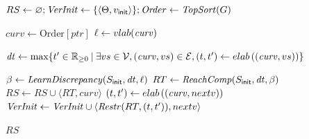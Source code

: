 \begin{algorithm}[h!]
\caption{$\GraphReach(\H)$ computes bounded time reachtubes for each vertex of the transition $G$ of hybrid system $\H$.}
\label{alg:ComputeRT}
{$RS \gets \varnothing; \mathit{VerInit} \gets \{\langle \Theta, v_{\sf init} \rangle\}; \mathit{Order} \gets \mathit{TopSort}(G)$\;} 
{	
	{$\mathit{curv} \gets \mathrm{Order}[ptr]$ \;} 
	{$\ell \gets {\sc vlab}(\mathit{curv})$\;} 

	$\mathit{dt} \gets \textrm{max} \{t' \in \nnreals \:| \:\exists vs \in \V, (\mathit{curv}, vs) \in \E, (t,t') \gets \edgelab \left( (\mathit{curv}, vs) \right) \}$\; 

	{
		{$\beta \gets \mathit{LearnDiscrepancy}(S_{\sf init},\mathit{dt},\ell)$\;} 
		{$  RT \gets \mathit{ReachComp}(S_{\sf init},\mathit{dt},\beta)$\;} 
		{$RS \gets RS \cup \langle RT, \mathit{curv} \rangle $\;}
		{
			$(t,t') \gets {\sc elab} \left( (\mathit{curv}, nextv) \right)$\; 
			$\mathit{VerInit} \gets \mathit{VerInit} \cup \langle  \mathit{Restr}(RT,(t,t')), nextv\rangle$\; 
		}
	}
}
\Return $RS$ \;
\end{algorithm}
 

